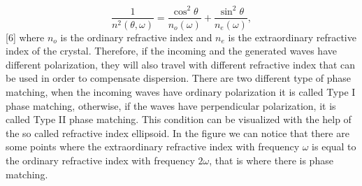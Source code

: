 \documentclass[a4paper,10pt]{article}
\begin{document}
\[\frac{1}{n^2(\theta,\omega)} = \frac{\cos^2\theta}{n_o(\omega)}+\frac{\sin^2\theta}{n_e(\omega)},\]
[6]
\hspace{-1.4em}where $n_o$ is the ordinary refractive index and $n_e$ is the extraordinary refractive index of the crystal. Therefore, if the incoming and the generated waves have different polarization, they will also travel with different refractive index that can be used in order to compensate dispersion.
There are two different type of phase matching, when the incoming waves have ordinary polarization it is called Type I phase matching, otherwise, if the waves have perpendicular polarization, it is called Type II phase matching. This condition can be visualized with the help of the so called refractive index ellipsoid. In the figure we can notice that there are some points where the extraordinary refractive index with frequency $\omega$ is equal to the ordinary refractive index with frequency $2\omega$, that is where there is phase matching.
\end{document}
